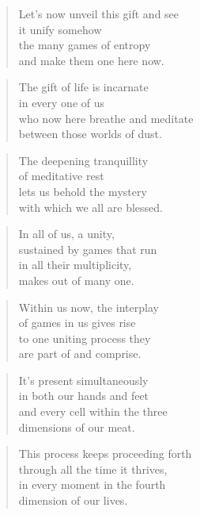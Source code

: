 \documentclass[14pt,a4paper]{article}
\begin{document}
\begin{verse}
Let’s now unveil this gift and see\\
it unify somehow\\
the many games of entropy\\
and make them one here now.
\end{verse}

\begin{verse}
The gift of life is incarnate\\
in every one of us\\
who now here breathe and meditate\\
between those worlds of dust.
\end{verse}

\begin{verse}
The deepening tranquillity\\
of meditative rest\\
lets us behold the mystery\\
with which we all are blessed.
\end{verse}

\begin{verse}
In all of us, a unity,\\
sustained by games that run\\
in all their multiplicity,\\
makes out of many one.
\end{verse}

\begin{verse}
Within us now, the interplay\\
of games in us gives rise\\
to one uniting process they\\
are part of and comprise.
\end{verse}

\begin{verse}
It’s present simultaneously\\
in both our hands and feet\\
and every cell within the three\\
dimensions of our meat.
\end{verse}

\begin{verse}
This process keeps proceeding forth\\
through all the time it thrives,\\
in every moment in the fourth\\
dimension of our lives.
\end{verse}
\end{document}
